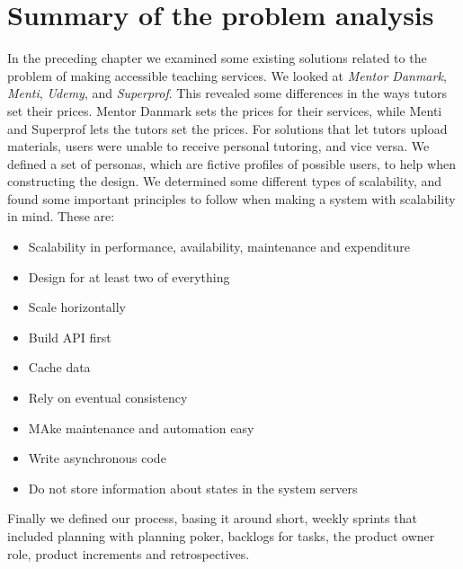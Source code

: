 \section{Summary of the problem analysis}
In the preceding chapter we examined some existing solutions related to the problem of making accessible teaching services.
We looked at \textit{Mentor Danmark}, \textit{Menti}, \textit{Udemy}, and \textit{Superprof}.
This revealed some differences in the ways tutors set their prices.
Mentor Danmark sets the prices for their services, while Menti and Superprof lets the tutors set the prices.
For solutions that let tutors upload materials, users were unable to receive personal tutoring, and vice versa.
We defined a set of personas, which are fictive profiles of possible users, to help when constructing the design.
We determined some different types of scalability, and found some important principles to follow when making a system with scalability in mind.
These are:
\begin{itemize}
    \item Scalability in performance, availability, maintenance and expenditure
    \item Design for at least two of everything
    \item Scale horizontally
    \item Build API first
    \item Cache data
    \item Rely on eventual consistency
    \item MAke maintenance and automation easy
    \item Write asynchronous code
    \item Do not store information about states in the system servers
\end{itemize}
Finally we defined our process, basing it around short, weekly sprints that included planning with planning poker, backlogs for tasks, the product owner role, product increments and retrospectives.
